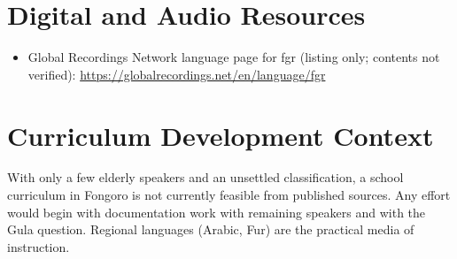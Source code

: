 \documentclass[12pt]{article}
\begin{document}
\section{Digital and Audio Resources}
\begin{itemize}
\item Global Recordings Network language page for fgr (listing only; contents not verified): \url{https://globalrecordings.net/en/language/fgr}
\end{itemize}

\section{Curriculum Development Context}
With only a few elderly speakers and an unsettled classification, a school curriculum in Fongoro is not currently feasible from published sources. Any effort would begin with documentation work with remaining speakers and with the Gula question. Regional languages (Arabic, Fur) are the practical media of instruction.
\end{document}
